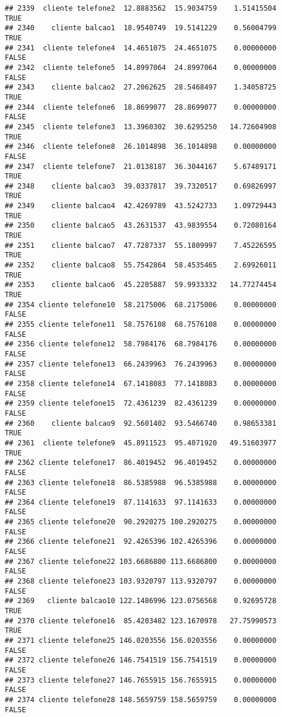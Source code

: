 \documentclass[
]{article}
\begin{document}
\begin{verbatim}
## 2339  cliente telefone2  12.8883562  15.9034759    1.51415504     TRUE
## 2340    cliente balcao1  18.9540749  19.5141229    0.56004799     TRUE
## 2341  cliente telefone4  14.4651075  24.4651075    0.00000000    FALSE
## 2342  cliente telefone5  14.8997064  24.8997064    0.00000000    FALSE
## 2343    cliente balcao2  27.2062625  28.5468497    1.34058725     TRUE
## 2344  cliente telefone6  18.8699077  28.8699077    0.00000000    FALSE
## 2345  cliente telefone3  13.3960302  30.6295250   14.72604908     TRUE
## 2346  cliente telefone8  26.1014898  36.1014898    0.00000000    FALSE
## 2347  cliente telefone7  21.0138187  36.3044167    5.67489171     TRUE
## 2348    cliente balcao3  39.0337817  39.7320517    0.69826997     TRUE
## 2349    cliente balcao4  42.4269789  43.5242733    1.09729443     TRUE
## 2350    cliente balcao5  43.2631537  43.9839554    0.72080164     TRUE
## 2351    cliente balcao7  47.7287337  55.1809997    7.45226595     TRUE
## 2352    cliente balcao8  55.7542864  58.4535465    2.69926011     TRUE
## 2353    cliente balcao6  45.2205887  59.9933332   14.77274454     TRUE
## 2354 cliente telefone10  58.2175006  68.2175006    0.00000000    FALSE
## 2355 cliente telefone11  58.7576108  68.7576108    0.00000000    FALSE
## 2356 cliente telefone12  58.7984176  68.7984176    0.00000000    FALSE
## 2357 cliente telefone13  66.2439963  76.2439963    0.00000000    FALSE
## 2358 cliente telefone14  67.1418083  77.1418083    0.00000000    FALSE
## 2359 cliente telefone15  72.4361239  82.4361239    0.00000000    FALSE
## 2360    cliente balcao9  92.5601402  93.5466740    0.98653381     TRUE
## 2361  cliente telefone9  45.8911523  95.4071920   49.51603977     TRUE
## 2362 cliente telefone17  86.4019452  96.4019452    0.00000000    FALSE
## 2363 cliente telefone18  86.5385988  96.5385988    0.00000000    FALSE
## 2364 cliente telefone19  87.1141633  97.1141633    0.00000000    FALSE
## 2365 cliente telefone20  90.2920275 100.2920275    0.00000000    FALSE
## 2366 cliente telefone21  92.4265396 102.4265396    0.00000000    FALSE
## 2367 cliente telefone22 103.6686800 113.6686800    0.00000000    FALSE
## 2368 cliente telefone23 103.9320797 113.9320797    0.00000000    FALSE
## 2369   cliente balcao10 122.1486996 123.0756568    0.92695728     TRUE
## 2370 cliente telefone16  85.4203482 123.1670978   27.75990573     TRUE
## 2371 cliente telefone25 146.0203556 156.0203556    0.00000000    FALSE
## 2372 cliente telefone26 146.7541519 156.7541519    0.00000000    FALSE
## 2373 cliente telefone27 146.7655915 156.7655915    0.00000000    FALSE
## 2374 cliente telefone28 148.5659759 158.5659759    0.00000000    FALSE

\end{verbatim}
\end{document}

